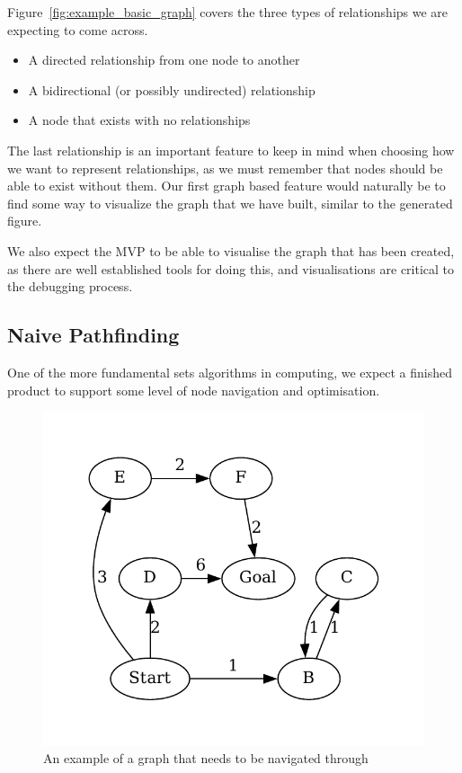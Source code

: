 Figure~\ref{fig:example_basic_graph} covers the three types of relationships we are expecting to come across.
\begin{itemize}
    \item A directed relationship from one node to another
    \item A bidirectional (or possibly undirected) relationship
    \item A node that exists with no relationships
\end{itemize}
The last relationship is an important feature to keep in mind when choosing how we want to represent relationships, as
we must remember that nodes should be able to exist without them.
Our first graph based feature would naturally be to find some way to visualize the graph that we have built, similar to
the generated figure.

We also expect the MVP to be able to visualise the graph that has been created, as there are well established tools for
doing this, and visualisations are critical to the debugging process.

\subsection{Naive Pathfinding}\label{subsec:naive-pathfinding}
One of the more fundamental sets algorithms in computing, we expect a finished product to support some level of node
navigation and optimisation.

\begin{figure}[H]
    \centering
    \includegraphics[width=12cm]{figures/example_graphs/pathfinding.gv}
    \caption{An example of a graph that needs to be navigated through}
    \label{fig:example_pathfinding_graph}
\end{figure}

